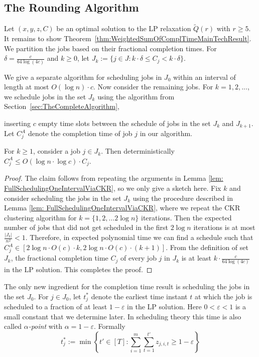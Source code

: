 \subsection{The Rounding Algorithm}
Let $(x, y, z, C)$ be an optimal solution to the LP relaxation $\tilde{Q}(r)$ with $r \geq 5$.
It remains to show Theorem~\ref{thm:WeightedSumOfComplTimeMainTechResult}.
We partition the jobs based on their fractional completion times. 
For  $\delta = \frac{c}{64 \log(4c)}$
and  $k \geq 0$, let $J_k := \{j \in J : k \cdot \delta \leq C_j < k \cdot \delta\}$. 

 
We give a separate  algorithm for scheduling jobs in $J_0$ within an interval of length at most $O(\log n) \cdot c$.
Now consider the remaining jobs.
For $k = 1,2,...$, we schedule jobs in the set $J_k$  using the algorithm from Section~\ref{sec:TheCompleteAlgorithm},


inserting $c$ empty time slots between the schedule of jobs in the set $J_k$ and $J_{k+1}$.
Let $C^{A}_j$ denote the completion time of job $j$ in our algorithm.

\begin{lemma}
\label{lem:comp5}
For $k \geq 1$, consider a job $j \in J_k$. Then deterministically $C^{A}_j \leq O(\log n \cdot \log c) \cdot C_j $.
\end{lemma}

\begin{proof}
The claim follows from repeating the arguments in Lemma \ref{lem: FullSchedulingOneIntervalViaCKR}, so we only give a sketch here. 
Fix $k$ and consider scheduling the jobs in the set $J_k$ using the procedure described in Lemma \ref{lem: FullSchedulingOneIntervalViaCKR}, where we repeat the CKR clustering algorithm for $k = \{1,2, \ldots 2\log n\}$ iterations. 
Then the expected number of jobs that did not get scheduled in the first $2\log n$ iterations is at most $\frac{|J_k|}{n^2} < 1$. Therefore, in expected polynomial time we can find a schedule such that  $C^{A}_j  \in [2\log n \cdot O(c) \cdot k, 2\log n \cdot O(c) \cdot (k+1)]$.
From the definition of set $J_k$,  the fractional completion time $C_j$ of every job $j$ in $J_k$ is at least $k \cdot \frac{c}{64 \log (4c)}$ in the LP solution.
This completes the proof.
\end{proof}

The only new ingredient  for the completion time result is scheduling the jobs in the set $J_0$. 
For $j \in J_0$, let $t^*_j$ denote the earliest time instant $t$ at which the job is  scheduled to a fraction of at least $1-\varepsilon$ in the LP solution. Here $0<\varepsilon<1$ is a small constant that we determine later.
In scheduling theory this time is also called \emph{$\alpha$-point} with $\alpha = 1-\varepsilon$.
Formally 
\begin{equation} \label{eq:AlphaPoints}
  t^*_j := \min \left\{t' \in [T]:  \sum_{i=1}^m  \sum^{t'}_{t = 1} z_{j,i,t} \geq 1-\varepsilon   \right\}
\end{equation}


